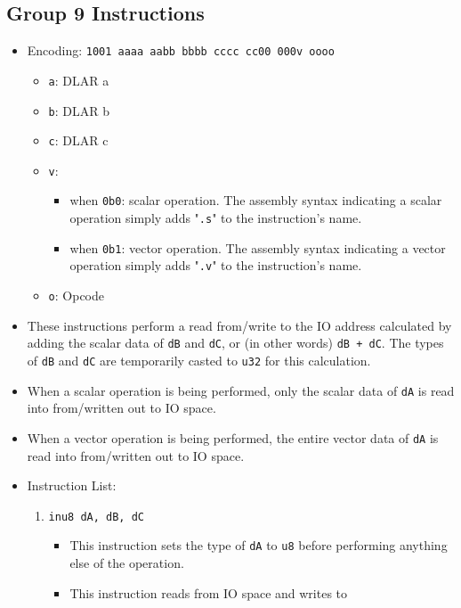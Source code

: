 \documentclass{article}
\begin{document}
	\subsection{Group 9 Instructions}
		\begin{itemize}
		\item Encoding: \texttt{1001 aaaa aabb bbbb  cccc cc00 000v oooo}
			\begin{itemize}
			\item \texttt{a}: DLAR a
			\item \texttt{b}: DLAR b
			\item \texttt{c}: DLAR c
			\item \texttt{v}:
				\begin{itemize}
				\item when \texttt{0b0}: scalar operation. The assembly
					syntax indicating a scalar operation simply adds
					"\texttt{.s}" to the instruction's name.
				\item when \texttt{0b1}: vector operation. The assembly
					syntax indicating a vector operation simply adds
					"\texttt{.v}" to the instruction's name.
				\end{itemize}
			\item \texttt{o}: Opcode
			\end{itemize}
		\item These instructions perform a read from/write to the IO
			address calculated by adding the scalar data of \texttt{dB} and
			\texttt{dC}, or (in other words) \texttt{dB + dC}. The types of
			\texttt{dB} and \texttt{dC} are temporarily casted to
			\texttt{u32} for this calculation.
		\item When a scalar operation is being performed, only the
			scalar data of \texttt{dA} is read into from/written out to IO
			space.
		\item When a vector operation is being performed, the
			entire vector data of \texttt{dA} is read into from/written out
			to IO space.
		\item Instruction List:
			\begin{enumerate}
			\item \texttt{inu8 dA, dB, dC}
				\begin{itemize}
				\item This instruction sets the type of \texttt{dA} to
					\texttt{u8} before performing anything else of the
					operation.
				\item This instruction reads from IO space and writes to

\end{itemize}
\end{enumerate}
\end{itemize}
\end{document}
